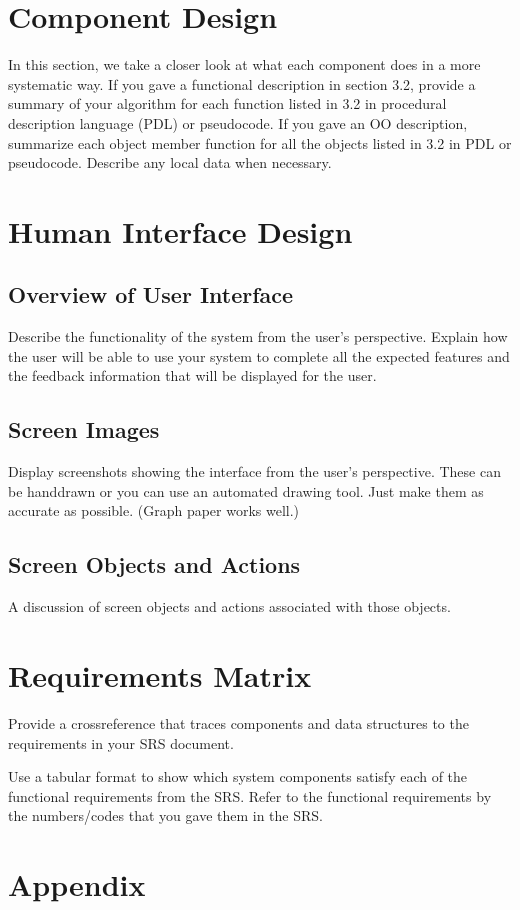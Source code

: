 \documentclass[titlepage]{article}
\begin{document}
\section{Component Design}
In this section, we take a closer look at what each component does in a more systematic way. If you gave a functional description in section 3.2, provide a summary of your algorithm for each function listed in 3.2 in procedural description language (PDL) or pseudocode. If you gave an OO description, summarize each object member function for all the objects listed in 3.2 in PDL or pseudocode. Describe any local data when necessary.


\section{Human Interface Design}
\subsection{Overview of User Interface}
Describe the functionality of the system from the user’s perspective. Explain how the user will be able to use your system to complete all the expected features and the feedback information that will be displayed for the user.

\subsection{Screen Images}
Display screenshots showing the interface from the user’s perspective. These can be handdrawn or you can use an automated drawing tool. Just make them as accurate as possible. (Graph paper works well.)

\subsection{Screen Objects and Actions}
A discussion of screen objects and actions associated with those objects.

\section{Requirements Matrix}
Provide a crossreference that traces components and data structures to the requirements in your SRS document.

Use a tabular format to show which system components satisfy each of the functional requirements from the SRS. Refer to the functional requirements by the numbers/codes that you gave them in the SRS.

\newpage
\appendix
\section{Appendix}
\end{document}
